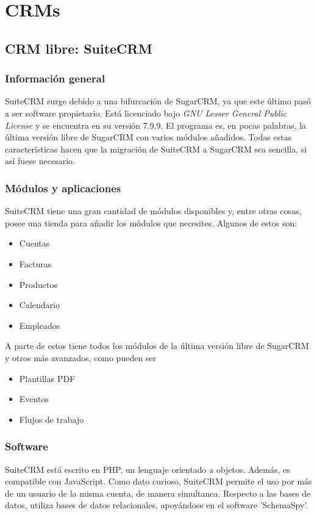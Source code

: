 \documentclass[openany,overnay,a4paper, twoside, 12pt]{book}
\begin{document}
\chapter*{\centering CRMs}
\setcounter{section}{0}
\section{CRM libre: SuiteCRM}
\subsection{Información general}
SuiteCRM surge debido a una bifurcación de SugarCRM, ya que este último pasó a ser software propietario. Está licenciado bajo \textit{GNU Lesser General Public License} y se encuentra en su versión 7.9.9. El programa es, en pocas palabras, la última versión libre de SugarCRM con varios módulos añadidos. Todas estas características hacen que la migración de SuiteCRM a SugarCRM sea sencilla, si así fuese necesario. 

\subsection{Módulos y aplicaciones}
SuiteCRM tiene una gran cantidad de módulos disponibles y, entre otras cosas, posee una tienda para añadir los módulos que necesites. Algunos de estos son: 
\begin{itemize}
    \item Cuentas
    \item Facturas
    \item Productos
    \item Calendario
    \item Empleados
\end{itemize}
A parte de estos tiene todos los módulos de la última versión libre de SugarCRM y otros más avanzados, como pueden ser
\begin{itemize}
    \item Plantillas PDF
    \item Eventos
    \item Flujos de trabajo
\end{itemize}
\subsection{Software}
SuiteCRM está escrito en PHP, un lenguaje orientado a objetos. Además, es compatible con JavaScript. Como dato curioso, SuiteCRM permite el uso por más de un usuario de la misma cuenta, de manera simultanea. Respecto a las bases de datos, utiliza bases de datos relacionales, apoyándose en el software 'SchemaSpy'.
\end{document}
